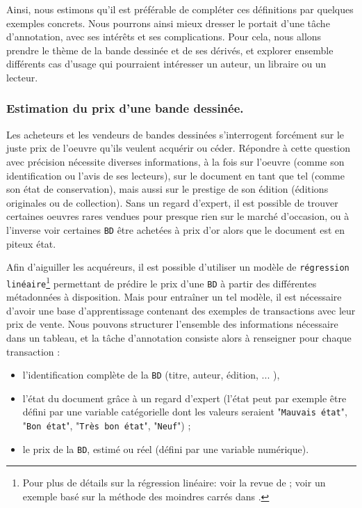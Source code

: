 		Ainsi, nous estimons qu'il est préférable de compléter ces définitions par quelques exemples concrets.
		Nous pourrons ainsi mieux dresser le portait d'une tâche d'annotation, avec ses intérêts et ses complications.
		Pour cela, nous allons prendre le thème de la bande dessinée et de ses dérivés, et explorer ensemble différents cas d'usage qui pourraient intéresser un auteur, un libraire ou un lecteur.
		
		
		\subsubsection{Estimation du prix d'une bande dessinée.}
		\label{section:2.1.2.A-PRESENTATION-ANNOTATION-EXEMPLES-REGRESSION}
		
			Les acheteurs et les vendeurs de bandes dessinées s'interrogent forcément sur le juste prix de l'oeuvre qu'ils veulent acquérir ou céder.
			Répondre à cette question avec précision nécessite diverses informations, à la fois sur l'oeuvre (comme son identification ou l'avis de ses lecteurs), sur le document en tant que tel (comme son état de conservation), mais aussi sur le prestige de son édition (éditions originales ou de collection).
			Sans un regard d'expert, il est possible de trouver certaines oeuvres rares vendues pour presque rien sur le marché d'occasion, ou à l'inverse voir certaines \texttt{BD} être achetées à prix d'or alors que le document est en piteux état.
			
			Afin d'aiguiller les acquéreurs, il est possible d’utiliser un modèle de \texttt{régression linéaire}\footnote{
				Pour plus de détails sur la régression linéaire: voir la revue de \cite{maalouf:2011:logistic-regression-data} ; voir un exemple basé sur la méthode des moindres carrés dans \cite{zdaniuk:2014:ordinary-leastsquares-ols}.
			} permettant de prédire le prix d'une \texttt{BD} à partir des différentes métadonnées à disposition.
			Mais pour entraîner un tel modèle, il est nécessaire d'avoir une base d'apprentissage contenant des exemples de transactions avec leur prix de vente.
			Nous pouvons structurer l'ensemble des informations nécessaire dans un tableau, et la tâche d'annotation consiste alors à renseigner pour chaque transaction :
			\begin{itemize}
				\item l'identification complète de la \texttt{BD} (titre, auteur, édition, ... ),
				\item l'état du document grâce à un regard d'expert (l'état peut par exemple être défini par une variable catégorielle dont les valeurs seraient "\texttt{Mauvais état}", "\texttt{Bon état}", "\texttt{Très bon état}", "\texttt{Neuf}") ;
				\item le prix de la \texttt{BD}, estimé ou réel (défini par une variable numérique).
			\end{itemize}
			
